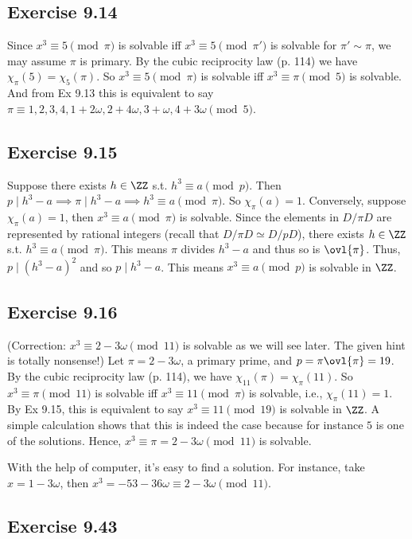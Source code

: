 \documentclass[../Chapter.tex]{subfiles}
\begin{document}
\subsection*{Exercise 9.14}

Since $x^3\equiv5\pmod{\pi}$ is solvable iff $x^3\equiv5\pmod{\pi'}$ is solvable for $\pi'\sim\pi$, we may assume $\pi$ is primary. By the cubic reciprocity law (p. 114) we have $\chi_\pi(5)=\chi_5(\pi)$. So $x^3\equiv5\pmod{\pi}$ is solvable iff $x^3\equiv\pi\pmod{5}$ is solvable. And from Ex 9.13 this is equivalent to say $\pi\equiv1,2,3,4,1+2\omega,2+4\omega,3+\omega,4+3\omega \pmod{5}$.

\subsection*{Exercise 9.15}

Suppose there exists $h\in\ZZ$ s.t. $h^3\equiv a\pmod{p}$. Then $p\mid h^3-a \implies \pi\mid h^3-a \implies h^3\equiv a\pmod{\pi}$. So $\chi_\pi(a)=1$. Conversely, suppose $\chi_\pi(a)=1$, then $x^3\equiv a\pmod{\pi}$ is solvable. Since the elements in $D/\pi D$ are represented by rational integers (recall that $D/\pi D\simeq D/pD$), there exists $h\in\ZZ$ s.t. $h^3\equiv a\pmod{\pi}$. This means $\pi$ divides $h^3-a$ and thus so is $\ovl{\pi}$. Thus, $p\mid (h^3-a)^2$ and so $p\mid h^3-a$. This means $x^3\equiv a\pmod{p}$ is solvable in $\ZZ$.

\subsection*{Exercise 9.16}

(Correction: $x^3\equiv2-3\omega\pmod{11}$ {\color{red}is} solvable as we will see later. The given hint is totally nonsense!) Let $\pi=2-3\omega$, a primary prime, and $p=\pi\ovl{\pi}=19$. By the cubic reciprocity law (p. 114), we have $\chi_{11}(\pi)=\chi_\pi(11)$. So $x^3\equiv\pi\pmod{11}$ is solvable iff $x^3\equiv11\pmod{\pi}$ is solvable, i.e., $\chi_\pi(11)=1$. By Ex 9.15, this is equivalent to say $x^3\equiv11\pmod{19}$ is solvable in $\ZZ$. A simple calculation shows that this is indeed the case because for instance $5$ is one of the solutions. Hence, $x^3\equiv\pi=2-3\omega\pmod{11}$ is solvable.

With the help of computer, it's easy to find a solution. For instance, take $x=1-3\omega$, then $x^3=-53-36\omega\equiv2-3\omega\pmod{11}$.

\subsection*{Exercise 9.43}
\end{document}
